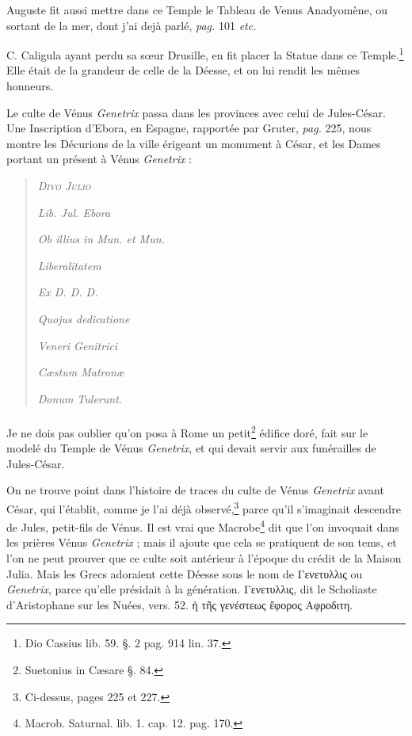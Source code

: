 \documentclass[a4paper, 11pt, oneside, polutonikogreek, french]{article}
\begin{document}
Auguste fit aussi mettre dans ce Temple le Tableau de Venus Anadyomène, ou sortant de la mer, dont j'ai dejà parlé, \emph{pag.} 101 \emph{etc.}

C. Caligula ayant perdu sa sœur Drusille, en fit placer la Statue dans ce Temple.\footnote{Dio Cassius lib. 59. §. 2 pag. 914 lin. 37.} Elle était de la grandeur de celle de la Déesse, et on lui rendit les mêmes honneurs.

Le culte de Vénus \emph{Genetrix} passa dans les provinces avec celui de Jules-César. Une Inscription d'Ebora, en Espagne, rapportée par Gruter, \emph{pag.} 225, nous montre les Décurions de la ville érigeant un monument à César, et les Dames portant un présent à Vénus \emph{Genetrix} :
\begin{quotation}
\scshape
\hspace*{10mm}\emph{Divo Julio}

\hspace*{5mm}\emph{Lib. Jul. Ebora}

\emph{Ob illius in Mun. et Mun.}

\hspace*{10mm}\emph{Liberalitatem}

\hspace*{15mm}\emph{Ex D. D. D.}

\hspace*{5mm}\emph{Quojus dedicatione}

\hspace*{10mm}\emph{Veneri Genitrici}

\hspace*{5mm}\emph{Cæstum Matronæ}

\hspace*{10mm}\emph{Donum Tulerunt.}
\end{quotation}
\paragraph{}
Je ne dois pas oublier qu'on posa à Rome un petit\footnote{Suetonius in Cæsare §. 84.} édifice doré, fait sur le modelé du Temple de Vénus \emph{Genetrix}, et qui devait servir aux funérailles de Jules-César.

On ne trouve point dans l'histoire de traces du culte de Vénus \emph{Genetrix} avant César, qui l'établit, comme je l'ai déjà observé,\footnote{Ci-dessus, pages 225 et 227.} parce qu'il s'imaginait descendre de Jules, petit-fils de Vénus. Il est vrai que Macrobe\footnote{Macrob. Saturnal. lib. 1. cap. 12. pag. 170.} dit que l'on invoquait dans les prières Vénus \emph{Genetrix} ; mais il ajoute que cela se pratiquent de son tems, et l'on ne peut prouver que ce culte soit antérieur à l'époque du crédit de la Maison Julia. Mais les Grecs adoraient cette Déesse sous le nom de Γενετυλλις ou \emph{Genetrix}, parce qu'elle présidait à la génération. Γενετυλλις, dit le Scholiaste d'Aristophane sur les Nuées, vers. 52. ἡ τῆς γενέστεως ἔφορος Αφροδιτη.
\end{document}
